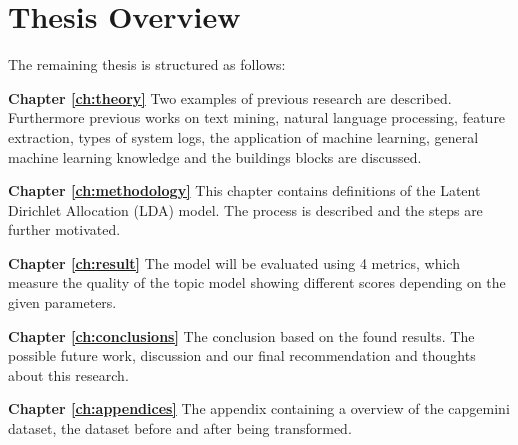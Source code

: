 \section{Thesis Overview} \label{introduction:thesisoverview}
The remaining thesis is structured as follows:

\setlength{\parindent}{3ex} \textbf{Chapter \ref{ch:theory}}\: Two examples of previous research are described. Furthermore previous works on text mining, natural language processing, feature extraction, types of system logs, the application of machine learning, general machine learning knowledge and the buildings blocks are discussed.

\textbf{Chapter \ref{ch:methodology}}\: This chapter contains definitions of the Latent Dirichlet Allocation (LDA) model. The process is described and the steps are further motivated. 

\textbf{Chapter \ref{ch:result}}\: The model will be evaluated using 4 metrics, which measure the quality of the topic model showing different scores depending on the given parameters.

\textbf{Chapter \ref{ch:conclusions}}\: The conclusion based on the found results. The possible future work, discussion and our final recommendation and thoughts about this research.

\textbf{Chapter \ref{ch:appendices}}\: The appendix containing a overview of the capgemini dataset, the dataset before and after being transformed.


\begin{comment}
It is recommended to end the introduction with an overview of the thesis. This chapter contains the introduction; Chapter~\ref{ch:definitions} includes the definitions; Chapter~\ref{ch:relatedwork} discusses related work; Chapter~\ref{ch:evaluation} evaluates the contributions; Chapter~\ref{ch:conclusions} concludes.

Also make a nice sentence with ``bachelor thesis'', LIACS and the names of the supervisors.

\end{comment}